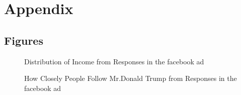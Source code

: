 \documentclass[
  letterpaper,
  DIV=11,
  numbers=noendperiod]{scrartcl}
\begin{document}
\section*{Appendix}\label{appendix}

\subsection{Figures}\label{figures}

\begin{figure}


\caption{\label{fig-figure1}Distribution of Income from Responses in the
facebook ad}

\end{figure}%

\begin{figure}


\caption{\label{fig-figure2}How Closely People Follow Mr.Donald Trump
from Responses in the facebook ad}

\end{figure}%
\end{document}
